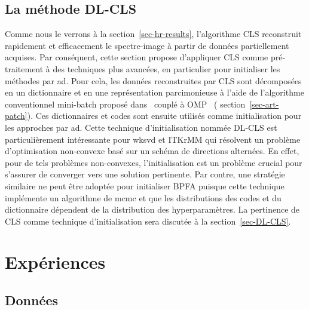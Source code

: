 \subsection{La méthode DL-CLS}

Comme nous le verrons à la section~\ref{sec-hr-results}, l'algorithme CLS reconstruit rapidement et efficacement le spectre-image à partir de données partiellement acquises. Par conséquent, cette section propose d'appliquer CLS comme pré-traitement à des techniques plus avancées, en particulier pour initialiser les méthodes par \gls{ad}. Pour cela, les données reconstruites par CLS sont décomposées en un dictionnaire et en une représentation parcimonieuse à l'aide de l'algorithme conventionnel mini-batch proposé dans~\cite{mairal2009online} couplé à OMP~\cite{mallat1993matching, pati1993orthogonal} (\cf{} section~\ref{sec-art-patch}). Ces dictionnaires et codes sont ensuite utilisés comme initialisation pour les approches par \gls{ad}.
%
Cette technique d'initialisation nommée DL-CLS est particulièrement intéressante pour \gls{wksvd} et ITKrMM qui résolvent un problème d'optimisation non-convexe basé sur un schéma de directions alternées. En effet, pour de tels problèmes non-convexes, l'initialisation est un problème crucial pour s'assurer de converger vers une solution pertinente.
%
Par contre, une stratégie similaire ne peut être adoptée pour initialiser BPFA puisque cette technique implémente un algorithme de \gls{mcmc} et que les distributions des codes et du dictionnaire dépendent de la distribution des hyperparamètres.
%
La pertinence de CLS comme technique d'initialisation sera discutée à la section~\ref{sec-DL-CLS}.

%
\section{Expériences}\label{sec-experiments-hr}

\subsection{Données}\label{sec-donnees-hr}

